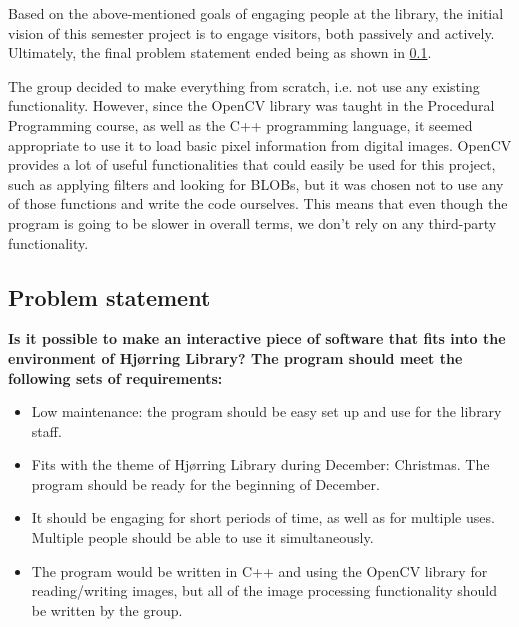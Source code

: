 Based on the above-mentioned goals of engaging people at the library, the initial vision of this semester project is to engage visitors, both passively and actively. Ultimately, the final problem statement ended being as shown in \ref{problemStatement}.

The group decided to make everything from scratch, i.e. not use any existing functionality. However, since the OpenCV library was taught in the Procedural Programming course, as well as the C++ programming language, it seemed appropriate to use it to load basic pixel information from digital images. OpenCV provides a lot of useful functionalities that could easily be used for this project, such as applying filters and looking for BLOBs, but it was chosen not to use any of those functions and write the code ourselves. This means that even though the program is going to be slower in overall terms, we don't rely on any third-party functionality.


\subsection{Problem statement}\label{problemStatement}
\textbf{Is it possible to make an interactive piece of software that fits into the environment of Hj{\o}rring Library? The program should meet the following sets of requirements:}

\begin{itemize}
\item Low maintenance: the program should be easy set up and use for the library staff.
\item Fits with the theme of Hj{\o}rring Library during December: Christmas. The program should be ready for the beginning of December.
\item It should be engaging for short periods of time, as well as for multiple uses. Multiple people should be able to use it simultaneously.
\item The program would be written in C++ and using the OpenCV library for reading/writing images, but all of the image processing functionality should be written by the group.
\end{itemize}